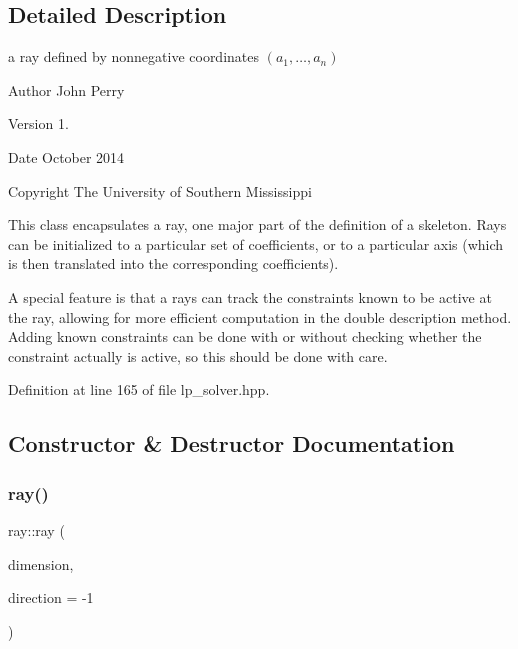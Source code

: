 \subsection{Detailed Description}
a ray defined by nonnegative coordinates $(a_1,\ldots,a_n)$ 

\begin{DoxyAuthor}{Author}
John Perry 
\end{DoxyAuthor}
\begin{DoxyVersion}{Version}
1. 
\end{DoxyVersion}
\begin{DoxyDate}{Date}
October 2014 
\end{DoxyDate}
\begin{DoxyCopyright}{Copyright}
The University of Southern Mississippi
\end{DoxyCopyright}
This class encapsulates a ray, one major part of the definition of a skeleton. Rays can be initialized to a particular set of coefficients, or to a particular axis (which is then translated into the corresponding coefficients).

A special feature is that a rays can track the constraints known to be active at the ray, allowing for more efficient computation in the double description method. Adding known constraints can be done with or without checking whether the constraint actually is active, so this should be done with care. 

Definition at line 165 of file lp\+\_\+solver.\+hpp.



\subsection{Constructor \& Destructor Documentation}
\mbox{\label{classray_a48d51151bb229b2b3363869760fe4b3c}} 
\subsubsection{\texorpdfstring{ray()}{ray()}\hspace{0.1cm}{\footnotesize\ttfamily [1/5]}}
{\footnotesize\ttfamily ray\+::ray (\begin{DoxyParamCaption}\item[{N\+V\+A\+R\+\_\+\+T\+Y\+PE}]{dimension,  }\item[{long}]{direction = {\ttfamily -\/1} }\end{DoxyParamCaption})}



